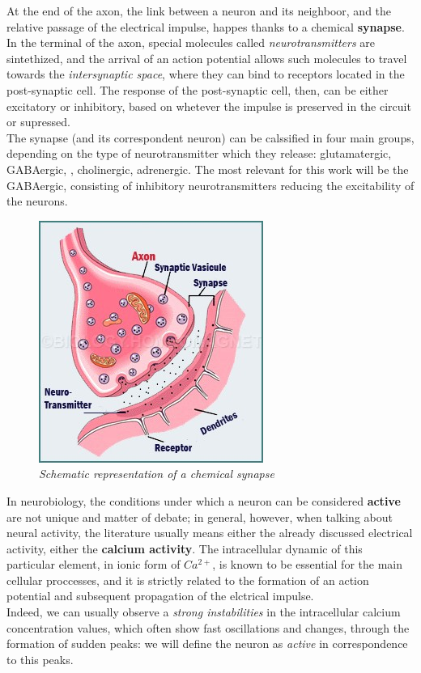 \documentclass[a4paper]{article}
\begin{document}
At the end of the axon, the link between a neuron and its neighboor, and the relative passage of the electrical impulse, happes thanks to a chemical \textbf{synapse}. In the terminal of the axon, special molecules called \textit{neurotransmitters} are sintethized, and the arrival of an action potential allows such molecules to travel towards the \textit{intersynaptic space}, where they can bind to receptors located in the post-synaptic cell. The response of the post-synaptic cell, then, can be either excitatory or inhibitory, based on whetever the impulse is preserved in the circuit or supressed.\\
The synapse (and its correspondent neuron) can be calssified in four main groups, depending on the type of neurotransmitter which they release:  glutamatergic, GABAergic, , cholinergic,  adrenergic. The most relevant for this work will be the GABAergic, consisting of inhibitory neurotransmitters reducing the excitability of the neurons.
\begin{figure}[H]
	\begin{center}
		\includegraphics[scale=1.6]{synapse.jpg} 
	\end{center} 
	\caption{\textit{Schematic representation of a chemical synapse}}
	
\end{figure}



In neurobiology, the conditions under which a neuron can be considered \textbf{active} are not unique and matter of debate; in general, however, when talking about neural activity, the literature usually means either the already discussed electrical activity, either the \textbf{calcium activity}. The intracellular dynamic of this particular element, in ionic form of $Ca^{2+}$, is known to be essential for the main cellular proccesses, and it is strictly related to the formation of an action potential and subsequent propagation of the elctrical impulse.\\
 Indeed, we can usually observe a \textit{strong instabilities} in the intracellular calcium concentration values, which often show fast oscillations and changes, through the formation of sudden peaks: we will define the neuron as \textit{active} in correspondence to this peaks.
\end{document}

